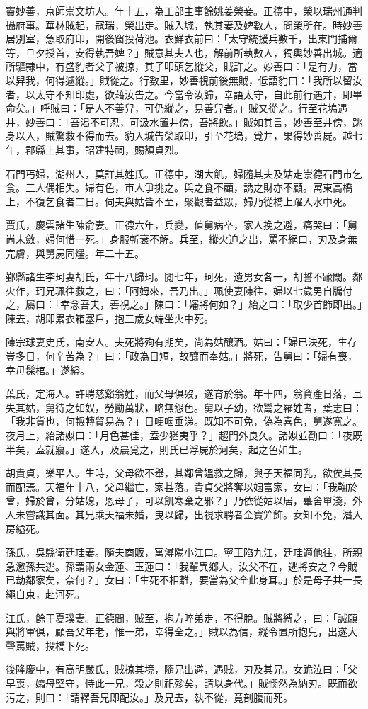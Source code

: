 \begin{pinyinscope}
竇妙善，京師崇文坊人。年十五，為工部主事餘姚姜榮妾。正德中，榮以瑞州通判攝府事。華林賊起，寇瑞，榮出走。賊入城，執其妻及婢數人，問榮所在。時妙善居別室，急取府印，開後窗投荷池。衣鮮衣前曰：「太守統援兵數千，出東門捕爾等，旦夕授首，安得執吾婢？」賊意其夫人也，解前所執數人，獨輿妙善出城。適所驅隸中，有盛豹者父子被掠，其子叩頭乞縱父，賊許之。妙善曰：「是有力，當以舁我，何得遽縱。」賊從之。行數里，妙善視前後無賊，低語豹曰：「我所以留汝者，以太守不知印處，欲藉汝告之。今當令汝歸，幸語太守，自此前行遇井，即畢命矣。」呼賊曰：「是人不善舁，可仍縱之，易善舁者。」賊又從之。行至花塢遇井，妙善曰：「吾渴不可忍，可汲水置井傍，吾將飲。」賊如其言，妙善至井傍，跳身以入，賊驚救不得而去。豹入城告榮取印，引至花塢，覓井，果得妙善屍。越七年，郡縣上其事，詔建特祠，賜額貞烈。

石門丐婦，湖州人，莫詳其姓氏。正德中，湖大飢，婦隨其夫及姑走崇德石門市乞食。三人偶相失。婦有色，市人爭挑之。與之食不顧，誘之財亦不顧。寓東高橋上，不復乞食者二日。伺夫與姑皆不至，聚觀者益眾，婦乃從橋上躍入水中死。

賈氏，慶雲諸生陳俞妻。正德六年，兵變，值舅病卒，家人挽之避，痛哭曰：「舅尚未斂，婦何惜一死。」身服斬衰不解。兵至，縱火迫之出，罵不絕口，刃及身無完膚，與舅屍同燼。年二十五。

鄞縣諸生李珂妻胡氏，年十八歸珂。閱七年，珂死，遺男女各一，胡誓不踰閾。鄰火作，珂兄珮往救之，曰：「阿姆來，吾乃出。」珮使妻陳往，婦以七歲男自牖付之，屬曰：「幸念吾夫，善視之。」陳曰：「嬸將何如？」紿之曰：「取少首飾即出。」陳去，胡即累衣箱塞戶，抱三歲女端坐火中死。

陳宗球妻史氏，南安人。夫死將殉有期矣，尚為姑釀酒。姑曰：「婦已決死，生存豈多日，何辛苦為？」曰：「政為日短，故釀而奉姑。」將死，告舅曰：「婦有喪，幸毋髹棺。」遂縊。

葉氏，定海人。許聘慈谿翁姓，而父母俱歿，遂育於翁。年十四，翁資產日落，且失其姑，舅待之如奴，勞勩萬狀，略無怨色。舅以子幼，欲鬻之羅姓者，葉恚曰：「我非貨也，何輾轉貿易為？」日哽咽垂涕。既知不可免，偽為喜色，舅遂寬之。夜月上，紿諸姒曰：「月色甚佳，盍少猶夷乎？」趨門外良久。諸姒並勸曰：「夜既半矣，盍就寢。」遂入，及晨覓之，則氏已浮屍於河矣，起之色如生。

胡貴貞，樂平人。生時，父母欲不舉，其鄰曾媼救之歸，與子天福同乳，欲俟其長而配焉。天福年十八，父母繼亡，家甚落。貴貞父將奪以姻富家，女曰：「我鞠於曾，婦於曾，分姑媳，恩母子，可以飢寒棄之邪？」乃依從姑以居，蓽舍單淺，外人未嘗識其面。其兄乘天福未婚，曳以歸，出視求聘者金寶笄飾。女知不免，潛入房縊死。

孫氏，吳縣衛廷珪妻。隨夫商販，寓潯陽小江口。寧王陷九江，廷珪適他往，所親急邀孫共逃。孫謂兩女金蓮、玉蓮曰：「我輩異鄉人，汝父不在，逃將安之？今賊已劫鄰家矣，奈何？」女曰：「生死不相離，要當為父全此身耳。」於是母子共一長繩自束，赴河死。

江氏，餘干夏璞妻。正德間，賊至，抱方晬弟走，不得脫。賊將縛之，曰：「誠願與將軍俱，顧吾父年老，惟一弟，幸得全之。」賊以為信，縱令置所抱兒，出遂大聲罵賊，投橋下死。

後隆慶中，有高明嚴氏，賊掠其境，隨兄出避，遇賊，刃及其兄。女跪泣曰：「父早喪，孀母堅守，恃此一兄，殺之則祀殄矣，請以身代。」賊憫然為納刃。既而欲污之，則曰：「請釋吾兄即配汝。」及兄去，執不從，竟剖腹而死。


\end{pinyinscope}